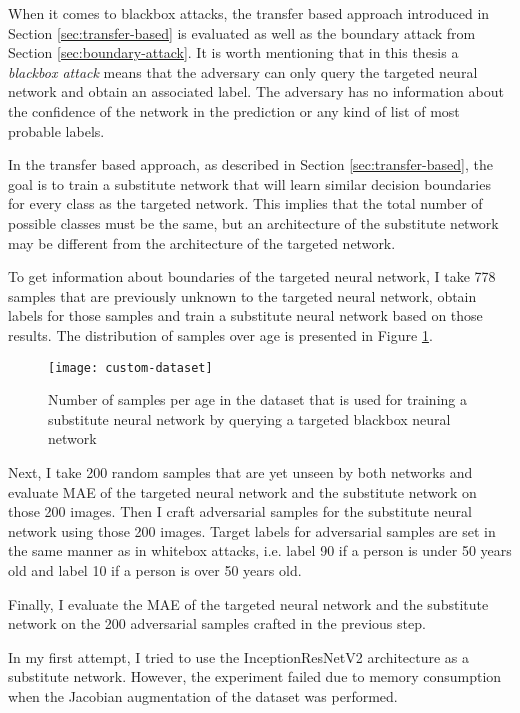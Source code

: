 When it comes to blackbox attacks, the transfer based approach introduced in Section \ref{sec:transfer-based} is evaluated as well as the boundary attack from Section \ref{sec:boundary-attack}. It is worth mentioning that in this thesis a \textit{blackbox attack} means that the adversary can only query the targeted neural network and obtain an associated label. The adversary has no information about the confidence of the network in the prediction or any kind of list of most probable labels.

In the transfer based approach, as described in Section \ref{sec:transfer-based}, the goal is to train a substitute network that will learn similar decision boundaries for every class as the targeted network. This implies that the total number of possible classes must be the same, but an architecture of the substitute network may be different from the architecture of the targeted network.

To get information about boundaries of the targeted neural network,  I take 778 samples that are previously unknown to the targeted neural network, obtain labels for those samples and train a substitute neural network based on those results. The distribution of samples over age is presented in Figure \ref{fig:custom-dataset}.
 
 \begin{figure}[h]
\texttt{[image: custom-dataset]}
\caption{Number of samples per age in the dataset that is used for training a substitute neural network by querying a targeted blackbox neural network}
\label{fig:custom-dataset}
\end{figure}

Next, I take 200 random samples that are yet unseen by both networks and evaluate MAE of the targeted neural network and the substitute network on those 200 images. Then I craft adversarial samples for the substitute neural network using those 200 images. Target labels for adversarial samples are set in the same manner as in whitebox attacks, i.e. label 90 if a person is under 50 years old and label 10 if a person is over 50 years old. 

Finally, I evaluate the MAE of the targeted neural network and the substitute network on the 200 adversarial samples crafted in the previous step.

In my first attempt, I tried to use the InceptionResNetV2 architecture as a substitute network. However, the experiment failed due to memory consumption when the Jacobian augmentation of the dataset was performed. 

